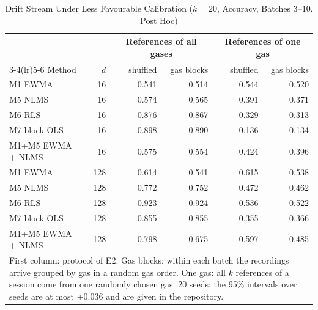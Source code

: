 \begin{table}[t]
\caption{Drift Stream Under Less Favourable Calibration ($k=20$, Accuracy, Batches 3--10, Post Hoc)}
\label{tab:scen}\centering\scriptsize\setlength{\tabcolsep}{3pt}
\begin{tabular}{l r rrrr}\toprule
 & & \multicolumn{2}{c}{References of all gases} & \multicolumn{2}{c}{References of one gas}\\\cmidrule(lr){3-4}\cmidrule(lr){5-6}
Method & $d$ & shuffled & gas blocks & shuffled & gas blocks\\\midrule
M1 EWMA & 16 & 0.541 & 0.514 & 0.544 & 0.520\\
M5 NLMS & 16 & 0.574 & 0.565 & 0.391 & 0.371\\
M6 RLS & 16 & 0.876 & 0.867 & 0.329 & 0.313\\
M7 block OLS & 16 & 0.898 & 0.890 & 0.136 & 0.134\\
M1+M5 EWMA + NLMS & 16 & 0.575 & 0.554 & 0.424 & 0.396\\
\midrule
M1 EWMA & 128 & 0.614 & 0.541 & 0.615 & 0.538\\
M5 NLMS & 128 & 0.772 & 0.752 & 0.472 & 0.462\\
M6 RLS & 128 & 0.923 & 0.924 & 0.536 & 0.522\\
M7 block OLS & 128 & 0.855 & 0.855 & 0.355 & 0.366\\
M1+M5 EWMA + NLMS & 128 & 0.798 & 0.675 & 0.597 & 0.485\\
\bottomrule
\multicolumn{6}{p{0.95\columnwidth}}{\scriptsize First column: protocol of E2. Gas blocks: within each batch the recordings arrive grouped by gas in a random gas order. One gas: all $k$ references of a session come from one randomly chosen gas. 20 seeds; the 95\% intervals over seeds are at most $\pm0.036$ and are given in the repository.}
\end{tabular}
\end{table}
